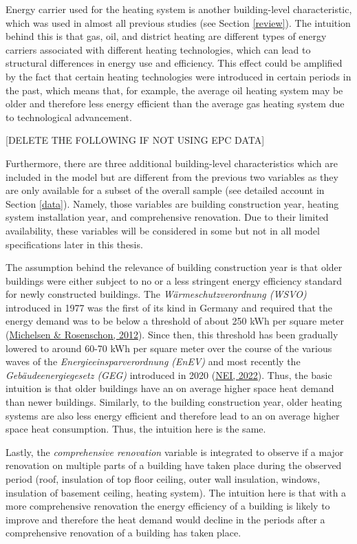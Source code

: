 \documentclass[12pt,twoside]{reedthesis}
\begin{document}
Energy carrier used for the heating system is another building-level characteristic, which was used in almost all previous studies (see Section \ref{review}). The intuition behind this is that gas, oil, and district heating are different types of energy carriers associated with different heating technologies, which can lead to structural differences in energy use and efficiency. This effect could be amplified by the fact that certain heating technologies were introduced in certain periods in the past, which means that, for example, the average oil heating system may be older and therefore less energy efficient than the average gas heating system due to technological advancement.

{[}DELETE THE FOLLOWING IF NOT USING EPC DATA{]}

Furthermore, there are three additional building-level characteristics which are included in the model but are different from the previous two variables as they are only available for a subset of the overall sample (see detailed account in Section \ref{data}). Namely, those variables are building construction year, heating system installation year, and comprehensive renovation. Due to their limited availability, these variables will be considered in some but not in all model specifications later in this thesis.

The assumption behind the relevance of building construction year is that older buildings were either subject to no or a less stringent energy efficiency standard for newly constructed buildings. The \emph{Wärmeschutzverordnung (WSVO)} introduced in 1977 was the first of its kind in Germany and required that the energy demand was to be below a threshold of about 250 kWh per square meter (\protect\hyperlink{ref-michelsen_rosenschon12}{Michelsen \& Rosenschon, 2012}). Since then, this threshold has been gradually lowered to around 60-70 kWh per square meter over the course of the various waves of the \emph{Energieeinsparverordnung (EnEV)} and most recently the \emph{Gebäudeenergiegesetz (GEG)} introduced in 2020 (\protect\hyperlink{ref-nei22}{NEI, 2022}). Thus, the basic intuition is that older buildings have an on average higher space heat demand than newer buildings. Similarly, to the building construction year, older heating systems are also less energy efficient and therefore lead to an on average higher space heat consumption. Thus, the intuition here is the same.

Lastly, the \emph{comprehensive renovation} variable is integrated to observe if a major renovation on multiple parts of a building have taken place during the observed period (roof, insulation of top floor ceiling, outer wall insulation, windows, insulation of basement ceiling, heating system). The intuition here is that with a more comprehensive renovation the energy efficiency of a building is likely to improve and therefore the heat demand would decline in the periods after a comprehensive renovation of a building has taken place.
\end{document}
